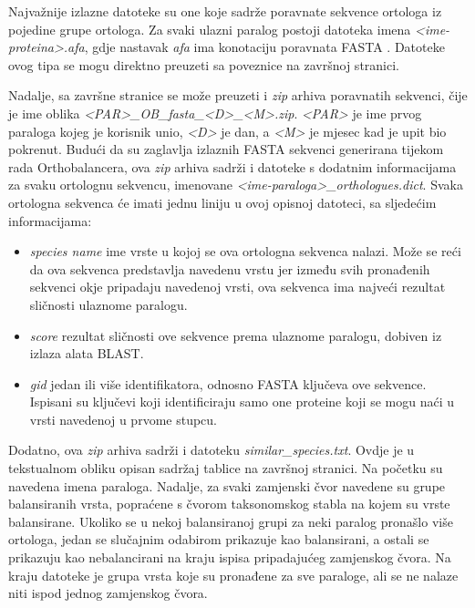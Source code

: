 Najvažnije izlazne datoteke su one koje sadrže poravnate sekvence ortologa iz
pojedine grupe ortologa. Za svaki ulazni paralog postoji datoteka imena
\emph{<ime-proteina>.afa}, gdje nastavak \emph{afa} ima konotaciju poravnata
FASTA . Datoteke ovog tipa se mogu direktno preuzeti sa
poveznice na završnoj stranici.

Nadalje, sa završne stranice se može preuzeti i \emph{zip} arhiva poravnatih
sekvenci, čije je ime oblika \emph{<PAR>\_OB\_fasta\_<D>\_<M>.zip}. \emph{<PAR>}
je ime prvog paraloga kojeg je korisnik unio, \emph{<D>} je dan, a \emph{<M>} je
mjesec kad je upit bio pokrenut. Budući da su zaglavlja izlaznih FASTA
sekvenci generirana tijekom rada Orthobalancera, ova \emph{zip} arhiva sadrži i
datoteke s dodatnim informacijama za svaku ortolognu sekvencu, imenovane
\emph{<ime-paraloga>\_orthologues.dict}. Svaka ortologna sekvenca će imati jednu
liniju u ovoj opisnoj datoteci, sa sljedećim informacijama:

\begin{itemize}

    \item \emph{species name} ime vrste u kojoj se ova ortologna sekvenca
nalazi. Može se reći da ova sekvenca predstavlja navedenu vrstu jer između svih
pronađenih sekvenci okje pripadaju navedenoj vrsti, ova sekvenca ima najveći
rezultat sličnosti ulaznome paralogu.

    \item \emph{score} rezultat sličnosti ove sekvence prema ulaznome paralogu,
dobiven iz izlaza alata BLAST.

    \item \emph{gid} jedan ili više identifikatora, odnosno FASTA ključeva ove
sekvence. Ispisani su ključevi koji identificiraju samo one proteine koji se
mogu naći u vrsti navedenoj u prvome stupcu.

\end{itemize}
Dodatno, ova \emph{zip} arhiva sadrži i datoteku \emph{similar\_species.txt}.
Ovdje je u tekstualnom obliku opisan sadržaj tablice na završnoj stranici. Na
početku su navedena imena paraloga. Nadalje, za svaki zamjenski čvor navedene su
grupe balansiranih vrsta, popraćene s čvorom taksonomskog stabla na kojem su
vrste balansirane. Ukoliko se u nekoj balansiranoj grupi za neki paralog
pronašlo više ortologa, jedan se slučajnim odabirom prikazuje kao balansirani, a
ostali se prikazuju kao nebalancirani  na kraju ispisa
pripadajućeg zamjenskog čvora. Na kraju datoteke je grupa vrsta koje su
pronađene za sve paraloge, ali se ne nalaze niti ispod jednog zamjenskog čvora.

